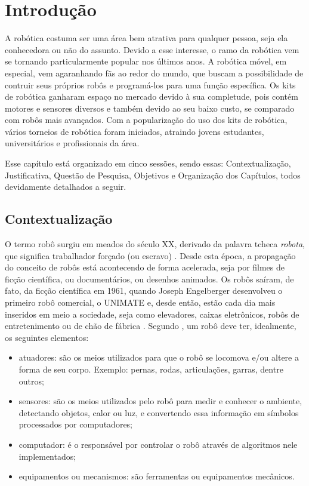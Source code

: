 \chapter{Introdução}
A robótica costuma ser uma área bem atrativa para qualquer pessoa, seja ela conhecedora ou não do assunto. Devido a esse interesse, o ramo da robótica vem se tornando particularmente popular nos últimos anos. A robótica móvel, em especial, vem agaranhando fãs ao redor do mundo, que buscam a possibilidade de contruir seus próprios robôs e programá-los para uma função específica. Os kits de robótica ganharam espaço no mercado devido à sua completude, pois contém motores e sensores diversos e também devido ao seu baixo custo, se comparado com robôs mais avançados. Com a popularização do uso dos kits de robótica, vários torneios de robótica foram iniciados, atraindo jovens estudantes, universitários e profissionais da área. 

Esse capítulo está organizado em cinco sessões, sendo essas: Contextualização, Justificativa, Questão de Pesquisa, Objetivos e Organização dos Capítulos, todos devidamente detalhados a seguir.

\section{Contextualização}

O termo robô surgiu em meados do século XX, derivado da palavra tcheca \textit{robota}, que significa trabalhador forçado (ou escravo) \cite{da2009roboeduc}. Desde esta época, a propagação do conceito de robôs está acontecendo de forma acelerada, seja por filmes de ficção científica, ou documentários, ou desenhos animados. 
Os robôs saíram, de fato, da ficção científica em 1961, quando Joseph Engelberger desenvolveu o primeiro robô comercial, o UNIMATE e, desde então, estão cada dia mais inseridos em meio a sociedade, seja como elevadores, caixas eletrônicos, robôs de entretenimento ou de chão de fábrica . 
Segundo \cite{da2009roboeduc}, um robô deve ter, idealmente, os seguintes elementos:
\begin{itemize}
\item atuadores: são os meios utilizados para que o robô se locomova e/ou altere a forma de seu corpo. Exemplo: pernas, rodas, articulações, garras, dentre outros;
\item sensores: são os meios utilizados pelo robô para medir e conhecer o ambiente, detectando objetos, calor ou luz, e convertendo essa informação em símbolos processados por computadores;
\item computador: é o responsável por controlar o robô através de algoritmos nele implementados;
\item equipamentos ou mecanismos: são ferramentas ou equipamentos mecânicos.
\end{itemize}

